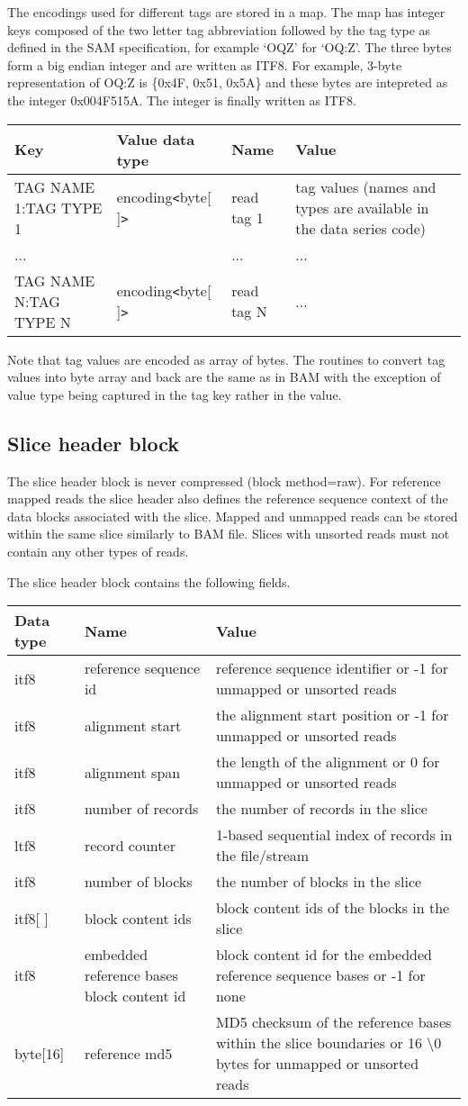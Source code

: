 \documentclass[a4paper]{article}
\begin{document}
The encodings used for different tags are stored in a map. The map has integer 
keys composed of the two letter tag abbreviation followed by the tag type as defined 
in the SAM specification, for example `OQZ' for `OQ:Z'. The three bytes form a 
big endian integer and are written as ITF8. For example, 3-byte representation 
of OQ:Z is \{0x4F, 0x51, 0x5A\} and these bytes are intepreted as the integer 0x004F515A. 
The integer is finally written as ITF8.

\begin{tabular}{|l|l|l|>{\raggedright}p{160pt}|}
\hline
\textbf{Key} & \textbf{Value data type} & \textbf{Name} & \textbf{Value}
\tabularnewline
\hline
TAG NAME 1:TAG TYPE 1 & encoding\texttt{<}byte[ ]\texttt{>} & read tag 1 & tag values 
(names and types are available in the data series code)\tabularnewline
\hline
... &  & ... & ...\tabularnewline
\hline
TAG NAME N:TAG TYPE N & encoding\texttt{<}byte[ ]\texttt{>} & read tag N & ...\tabularnewline
\hline
\end{tabular}

Note that tag values are encoded as array of bytes. The routines to convert tag 
values into byte array and back are the same as in BAM with the exception of value 
type being captured in the tag key rather in the value. 

\subsection{\textbf{Slice header block}}

The slice header block is never compressed (block method=raw). For reference mapped 
reads the slice header also defines the reference sequence context of the data 
blocks associated with the slice. Mapped and unmapped reads can be stored within 
the same slice similarly to BAM file. Slices with unsorted reads must not contain 
any other types of reads.

The slice header block contains the following fields.

\begin{tabular}{|l|l|>{\raggedright}p{200pt}|}
\hline
\textbf{Data type} & \textbf{Name} & \textbf{Value}\tabularnewline
\hline
itf8 & reference sequence id & reference sequence identifier or -1 for unmapped 
or unsorted reads\tabularnewline
\hline
itf8 & alignment start & the alignment start position or -1 for unmapped or unsorted 
reads\tabularnewline
\hline
itf8 & alignment span & the length of the alignment or 0 for unmapped or unsorted 
reads\tabularnewline
\hline
itf8 & number of records & the number of records in the slice\tabularnewline
\hline
ltf8 & record counter & 1-based sequential index of records in the file/stream\tabularnewline
\hline
itf8 & number of blocks & the number of blocks in the slice\tabularnewline
\hline
itf8[ ] & block content ids & block content ids of the blocks in the slice\tabularnewline
\hline
itf8 & embedded reference bases block content id & block content id for the embedded 
reference sequence bases or -1 for none\tabularnewline
\hline
byte[16] & reference md5 & MD5 checksum of the reference bases within the slice 
boundaries or 16 \textbackslash{}0 bytes for unmapped or unsorted reads\tabularnewline
\hline
\end{tabular}
\end{document}

